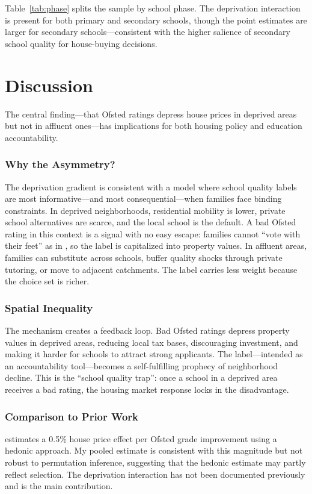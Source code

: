 \documentclass[12pt]{article}
\begin{document}
Table~\ref{tab:phase} splits the sample by school phase. The deprivation interaction is present for both primary and secondary schools, though the point estimates are larger for secondary schools---consistent with the higher salience of secondary school quality for house-buying decisions.

\section{Discussion}

The central finding---that Ofsted ratings depress house prices in deprived areas but not in affluent ones---has implications for both housing policy and education accountability.

\subsubsection*{Why the Asymmetry?} The deprivation gradient is consistent with a model where school quality labels are most informative---and most consequential---when families face binding constraints. In deprived neighborhoods, residential mobility is lower, private school alternatives are scarce, and the local school is the default. A bad Ofsted rating in this context is a signal with no easy escape: families cannot ``vote with their feet'' as in \citet{tiebout1956pure}, so the label is capitalized into property values. In affluent areas, families can substitute across schools, buffer quality shocks through private tutoring, or move to adjacent catchments. The label carries less weight because the choice set is richer.

\subsubsection*{Spatial Inequality} The mechanism creates a feedback loop. Bad Ofsted ratings depress property values in deprived areas, reducing local tax bases, discouraging investment, and making it harder for schools to attract strong applicants. The label---intended as an accountability tool---becomes a self-fulfilling prophecy of neighborhood decline. This is the ``school quality trap'': once a school in a deprived area receives a bad rating, the housing market response locks in the disadvantage.

\subsubsection*{Comparison to Prior Work} \citet{hussain2016housing} estimates a 0.5\% house price effect per Ofsted grade improvement using a hedonic approach. My pooled estimate is consistent with this magnitude but not robust to permutation inference, suggesting that the hedonic estimate may partly reflect selection. The deprivation interaction has not been documented previously and is the main contribution.
\end{document}

